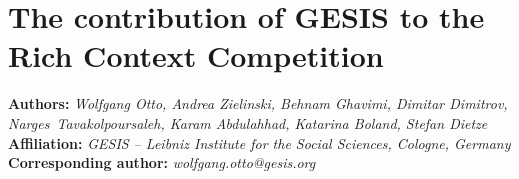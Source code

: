 \documentclass[fleqn]{template}
\begin{document}
    \section{The contribution of GESIS to the Rich Context Competition}
    \textbf{Authors:}
    \emph{Wolfgang Otto, Andrea Zielinski,
         Behnam Ghavimi,
         Dimitar Dimitrov,
         Narges~Tavakolpoursaleh,
         Karam Abdulahhad,
         Katarina Boland,
         Stefan Dietze
        }\\
    \textbf{Affiliation:}
    \emph{GESIS -- Leibniz Institute for the Social Sciences, Cologne, Germany}\\
    \textbf{Corresponding author:}
    \emph{wolfgang.otto@gesis.org} %

    
    
    
    
    
    
    
    
    
    
\end{document}
